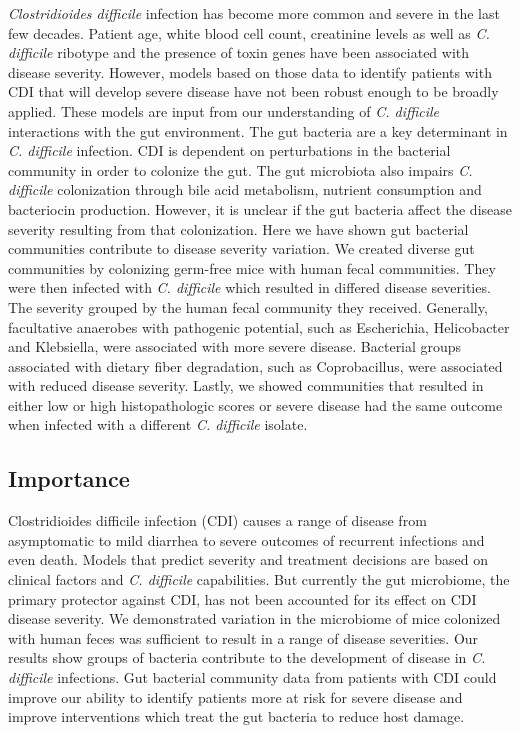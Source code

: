 \documentclass[
  12pt,
]{article}
\begin{document}
\emph{Clostridioides difficile} infection has become more common and
severe in the last few decades. Patient age, white blood cell count,
creatinine levels as well as \emph{C. difficile} ribotype and the
presence of toxin genes have been associated with disease severity.
However, models based on those data to identify patients with CDI that
will develop severe disease have not been robust enough to be broadly
applied. These models are input from our understanding of \emph{C.
difficile} interactions with the gut environment. The gut bacteria are a
key determinant in \emph{C. difficile} infection. CDI is dependent on
perturbations in the bacterial community in order to colonize the gut.
The gut microbiota also impairs \emph{C. difficile} colonization through
bile acid metabolism, nutrient consumption and bacteriocin production.
However, it is unclear if the gut bacteria affect the disease severity
resulting from that colonization. Here we have shown gut bacterial
communities contribute to disease severity variation. We created diverse
gut communities by colonizing germ-free mice with human fecal
communities. They were then infected with \emph{C. difficile} which
resulted in differed disease severities. The severity grouped by the
human fecal community they received. Generally, facultative anaerobes
with pathogenic potential, such as Escherichia, Helicobacter and
Klebsiella, were associated with more severe disease. Bacterial groups
associated with dietary fiber degradation, such as Coprobacillus, were
associated with reduced disease severity. Lastly, we showed communities
that resulted in either low or high histopathologic scores or severe
disease had the same outcome when infected with a different \emph{C.
difficile} isolate.

\hypertarget{importance}{%
\subsection{Importance}\label{importance}}

Clostridioides difficile infection (CDI) causes a range of disease from
asymptomatic to mild diarrhea to severe outcomes of recurrent infections
and even death. Models that predict severity and treatment decisions are
based on clinical factors and \emph{C. difficile} capabilities. But
currently the gut microbiome, the primary protector against CDI, has not
been accounted for its effect on CDI disease severity. We demonstrated
variation in the microbiome of mice colonized with human feces was
sufficient to result in a range of disease severities. Our results show
groups of bacteria contribute to the development of disease in \emph{C.
difficile} infections. Gut bacterial community data from patients with
CDI could improve our ability to identify patients more at risk for
severe disease and improve interventions which treat the gut bacteria to
reduce host damage.
\end{document}
